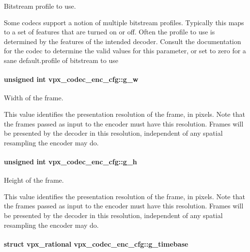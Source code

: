 Bitstream profile to use. 

Some codecs support a notion of multiple bitstream profiles. Typically this maps to a set of features that are turned on or off. Often the profile to use is determined by the features of the intended decoder. Consult the documentation for the codec to determine the valid values for this parameter, or set to zero for a sane default.\-profile of bitstream to use \hypertarget{structvpx__codec__enc__cfg_a5c165f5b41ca1158f2883983a2b7709c}{
\paragraph[{g\-\_\-w}]{\setlength{\rightskip}{0pt plus 5cm}unsigned int vpx\-\_\-codec\-\_\-enc\-\_\-cfg\-::g\-\_\-w}}\label{structvpx__codec__enc__cfg_a5c165f5b41ca1158f2883983a2b7709c}


Width of the frame. 

This value identifies the presentation resolution of the frame, in pixels. Note that the frames passed as input to the encoder must have this resolution. Frames will be presented by the decoder in this resolution, independent of any spatial resampling the encoder may do. \hypertarget{structvpx__codec__enc__cfg_a4132bd89ce85bce7c08f2cc3b6f2b82e}{
\paragraph[{g\-\_\-h}]{\setlength{\rightskip}{0pt plus 5cm}unsigned int vpx\-\_\-codec\-\_\-enc\-\_\-cfg\-::g\-\_\-h}}\label{structvpx__codec__enc__cfg_a4132bd89ce85bce7c08f2cc3b6f2b82e}


Height of the frame. 

This value identifies the presentation resolution of the frame, in pixels. Note that the frames passed as input to the encoder must have this resolution. Frames will be presented by the decoder in this resolution, independent of any spatial resampling the encoder may do. \hypertarget{structvpx__codec__enc__cfg_a6498d378e4c29ef3e22258289e481087}{
\paragraph[{g\-\_\-timebase}]{\setlength{\rightskip}{0pt plus 5cm}struct {\bf vpx\-\_\-rational} vpx\-\_\-codec\-\_\-enc\-\_\-cfg\-::g\-\_\-timebase}}\label{structvpx__codec__enc__cfg_a6498d378e4c29ef3e22258289e481087}


